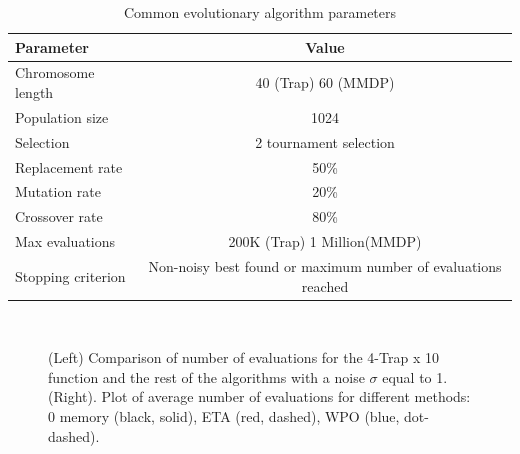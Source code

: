 \documentclass{svmult}
\begin{document}
\begin{table}[!t]%
\begin{center}
\caption{Common evolutionary algorithm parameters}
\label{fig:ga_params}
\begin{tabular}{lc}%
\hline\noalign{\smallskip}
\noalign{\smallskip}
Parameter & Value \\
\hline
\noalign{\smallskip}
Chromosome length & 40 (Trap) 60 (MMDP)\\
Population size & 1024\\
Selection & 2 tournament selection \\
Replacement rate & 50\% \\
Mutation rate & 20\% \\
Crossover rate &  80\% \\
Max evaluations & 200K (Trap) 1 Million(MMDP) \\
Stopping criterion & Non-noisy best found or maximum number of  evaluations reached \\
\hline
\end{tabular}
\end{center}
\end{table}
%
%
%
\begin{figure}[!t] %
\centering
{}
~
\caption{(Left) Comparison of number of evaluations for the 4-Trap x
  10 function and the rest of the algorithms with a noise $\sigma$
  equal to 1. (Right). Plot of average number of evaluations for
  different methods: 0 memory (black, solid), ETA (red, dashed), WPO
  (blue, dot-dashed). \label{fig:trap:evals}}
\end{figure}
\end{document}
